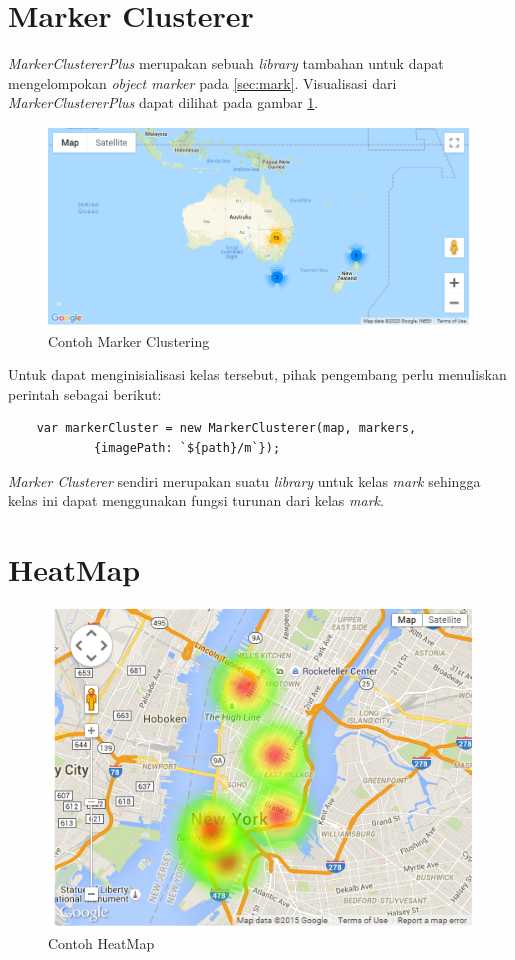 \section{Marker Clusterer}
 \textit{MarkerClustererPlus} merupakan sebuah \textit{library} tambahan untuk dapat mengelompokan \textit{object marker} pada \ref{sec:mark}. Visualisasi dari \textit{MarkerClustererPlus} dapat dilihat pada gambar \ref{fig:mcp}.
\begin{figure}[H]
	\centering
	\includegraphics[scale=0.5]{Gambar/marker_clustering.PNG}
	\caption{Contoh Marker Clustering}
	\label{fig:mcp}
\end{figure}
Untuk dapat  menginisialisasi kelas tersebut, pihak pengembang perlu menuliskan perintah sebagai berikut:
\begin{lstlisting}
    var markerCluster = new MarkerClusterer(map, markers,
            {imagePath: `${path}/m`});
\end{lstlisting}
\textit{Marker Clusterer} sendiri merupakan suatu \textit{library} untuk kelas \textit{mark} sehingga kelas ini dapat menggunakan fungsi turunan dari kelas \textit{mark}.

\section{HeatMap}
\begin{figure}[H]
	\centering
	\includegraphics[scale=0.8]{Gambar/heat-map-example.png}
	\caption{Contoh HeatMap}
	\label{fig:sechm}
\end{figure}


